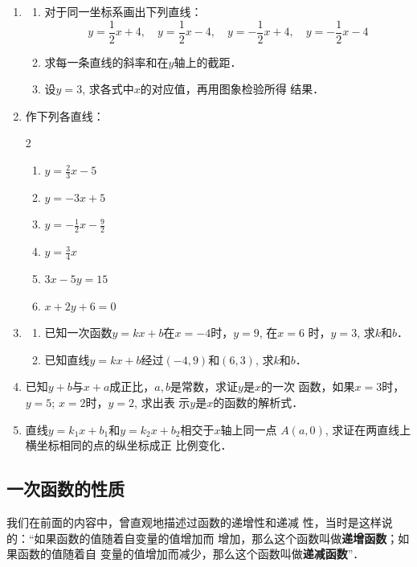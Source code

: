 \begin{ex}
\begin{enumerate}
    \item \begin{enumerate}
        \item 对于同一坐标系画出下列直线：
\[y=\frac{1}{2}x+4,\quad y=\frac{1}{2}x-4,\quad y=-\frac{1}{2}x+4,\quad y=-\frac{1}{2}x-4\]
\item 求每一条直线的斜率和在$y$轴上的截距．
\item 设$y=3$, 求各式中$x$的对应值，再用图象检验所得
结果．
    \end{enumerate}
    \item 作下列各直线：
\begin{multicols}{2}
    \begin{enumerate}
        \item $y=\frac{2}{3}x-5$
        \item $y=-3x+5$
        \item $y=-\frac{1}{2}x-\frac{9}{2}$
        \item $y=\frac{3}{4}x$
        \item $3x-5y=15$
        \item $x+2y+6=0$
    \end{enumerate}
\end{multicols}

\item \begin{enumerate}
    \item 已知一次函数$y=kx+b$在$x=-4$时，$y=9$, 在$x=6$
时，$y=3$, 求$k$和$b$．
\item 已知直线$y=kx+b$经过$(-4,9)$和$(6,3)$, 求$k$和$b$．
\end{enumerate}

\item 已知$y+b$与$x+a$成正比，$a,b$是常数，求证$y$是$x$的一次
函数，如果$x=3$时，$y=5$; $x=2$时，$y=2$, 求出表
示$y$是$x$的函数的解析式．
\item 直线$y=k_1x+b_1$和$y=k_2x+b_2$相交于$x$轴上同一点
$A(a,0)$, 求证在两直线上横坐标相同的点的纵坐标成正
比例变化．
\end{enumerate}
\end{ex}

\subsection{一次函数的性质}
我们在前面的内容中，曾直观地描述过函数的递增性和递减
性，当时是这样说的：“如果函数的值随着自变量的值增加而
增加，那么这个函数叫做\textbf{递增函数}；如果函数的值随着自
变量的值增加而减少，那么这个函数叫做\textbf{递减函数}”．

